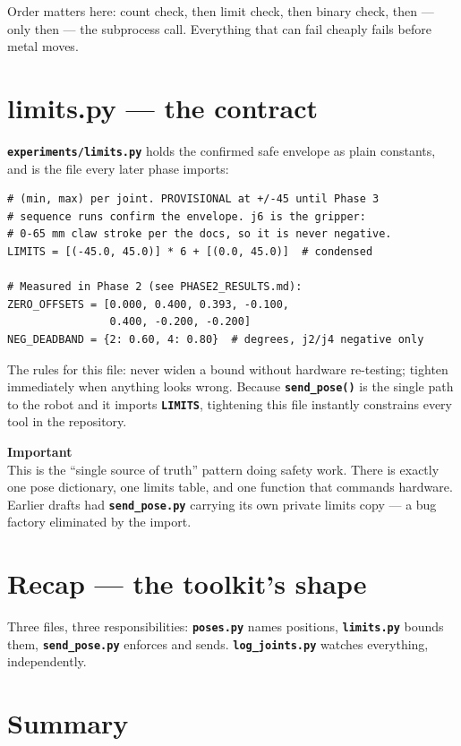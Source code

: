 \documentclass[11pt,twoside,openright]{book}
\newcommand{\code}[1]{\texttt{\bfseries #1}}
\newenvironment{pktimportant}{\begin{pktbox}\textbf{Important}\\[4pt]}{\end{pktbox}}
\newcommand{\codefile}[1]{%
  \par\vspace{10pt}\noindent{\ttfamily\small\bfseries #1}\par\nopagebreak\vspace{-8pt}}
\begin{document}
Order matters here: count check, then limit check, then binary check,
then --- only then --- the subprocess call. Everything that can fail
cheaply fails before metal moves.

\section{limits.py --- the contract}

\code{experiments/limits.py} holds the confirmed safe envelope as plain
constants, and is the file every later phase imports:

\codefile{experiments/limits.py}
\begin{lstlisting}[style=pktpython]
# (min, max) per joint. PROVISIONAL at +/-45 until Phase 3
# sequence runs confirm the envelope. j6 is the gripper:
# 0-65 mm claw stroke per the docs, so it is never negative.
LIMITS = [(-45.0, 45.0)] * 6 + [(0.0, 45.0)]  # condensed

# Measured in Phase 2 (see PHASE2_RESULTS.md):
ZERO_OFFSETS = [0.000, 0.400, 0.393, -0.100,
                0.400, -0.200, -0.200]
NEG_DEADBAND = {2: 0.60, 4: 0.80}  # degrees, j2/j4 negative only
\end{lstlisting}

The rules for this file: never widen a bound without hardware re-testing;
tighten immediately when anything looks wrong. Because \code{send\_pose()}
is the single path to the robot and it imports \code{LIMITS}, tightening
this file instantly constrains every tool in the repository.

\begin{pktimportant}
This is the ``single source of truth'' pattern doing safety work. There
is exactly one pose dictionary, one limits table, and one function that
commands hardware. Earlier drafts had \code{send\_pose.py} carrying its
own private limits copy --- a bug factory eliminated by the import.
\end{pktimportant}

\section{Recap --- the toolkit's shape}

Three files, three responsibilities: \code{poses.py} names positions,
\code{limits.py} bounds them, \code{send\_pose.py} enforces and sends.
\code{log\_joints.py} watches everything, independently.

\section*{Summary}
\end{document}
